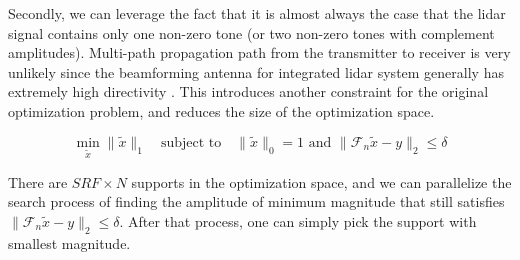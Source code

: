 \documentclass[11pt,journal, onecolumn]{IEEEtran}
\theoremstyle{theorem}
\begin{document}
Secondly, we can leverage the fact that it is almost always the case that the lidar signal contains only one non-zero tone (or two non-zero tones with complement amplitudes). Multi-path propagation path from the transmitter to receiver is very unlikely since the beamforming antenna for integrated lidar system generally has extremely high directivity \cite{yaacobi}. This introduces another constraint for the original optimization problem, and reduces the size of the optimization space.

\begin{equation}
    \min_{ \tilde{x} }{\| \tilde{x} \|_{1}} \quad \textrm{subject to} \quad \| \tilde{x} \|_0 = 1 \textrm{ and } \| \mathcal{F}_n \tilde{x} - y \|_2 \leq \delta
\end{equation}

There are $SRF \times N$ supports in the optimization space, and we can parallelize the search process of finding the amplitude of minimum magnitude that still satisfies $\| \mathcal{F}_n \tilde{x} - y \|_2 \leq \delta$. After that process, one can simply pick the support with smallest magnitude. 


\end{document}
